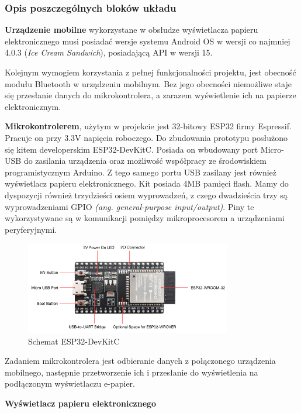 \documentclass[a4paper,12pt, twoside]{article}
\begin{document}
        \subsubsection{Opis poszczególnych bloków układu}
        \textbf{Urządzenie mobilne} wykorzystane w obsłudze wyświetlacza papieru elektronicznego musi posiadać wersje systemu Android OS w wersji co najmniej 4.0.3 (\textit{Ice Cream Sandwich})\cite{ics}, posiadającą API w wersji 15\cite{api}. 
        
        Kolejnym wymogiem korzystania z pełnej funkcjonalności projektu, jest obecność modułu Bluetooth w urządzeniu mobilnym. Bez jego obecności niemożliwe staje się przesłanie danych do mikrokontrolera, a zarazem wyświetlenie ich na papierze elektronicznym.
        
    	\textbf{Mikrokontrolerem}, użytym w projekcie jest 32-bitowy ESP32 firmy Espressif. Pracuje on przy 3.3V napięcia roboczego. Do zbudowania prototypu posłużono się kitem developerskim ESP32-DevKitC. Posiada on wbudowany port Micro-USB do zasilania urządzenia oraz możliwość współpracy ze środowiskiem programistycznym Arduino. Z tego samego portu USB zasilany jest również wyświetlacz papieru elektronicznego. Kit posiada 4MB pamięci flash\cite{flash}. Mamy do dyspozycji również trzydzieści osiem wyprowadzeń, z czego dwadzieścia trzy są wyprowadzeniami GPIO \textit{(ang. general-purpose input/output)}. Piny te wykorzystywane są w komunikacji pomiędzy mikroprocesorem a urządzeniami peryferyjnymi.
    	\begin{figure}[H]
    	        \centering
    			\includegraphics[width=9cm]{images/rys8_devkit.png}
    			\caption{Schemat ESP32-DevKitC\cite{devkit}}
                \label{fig:devkit}
    	\end{figure}
    	
    	Zadaniem mikrokontrolera jest odbieranie danych z połączonego urządzenia mobilnego, następnie przetworzenie ich i przesłanie do wyświetlenia na podłączonym wyświetlaczu e-papier.
    
        \textbf{Wyświetlacz papieru elektronicznego}
       
\end{document}
